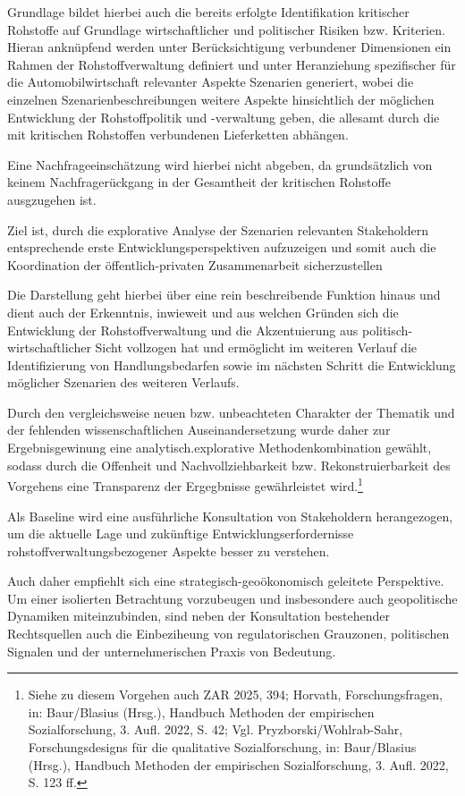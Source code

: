 \documentclass[12pt,a4paper,oneside]{book} %
\begin{document}
Grundlage bildet hierbei auch die bereits erfolgte Identifikation kritischer Rohstoffe auf Grundlage wirtschaftlicher und politischer Risiken bzw. Kriterien. Hieran anknüpfend werden unter Berücksichtigung verbundener Dimensionen ein Rahmen der Rohstoffverwaltung definiert und unter Heranziehung spezifischer für die Automobilwirtschaft relevanter Aspekte Szenarien generiert, wobei die einzelnen Szenarienbeschreibungen weitere Aspekte hinsichtlich der möglichen Entwicklung der Rohstoffpolitik und -verwaltung geben, die allesamt durch die mit kritischen Rohstoffen verbundenen Lieferketten abhängen.

Eine Nachfrageeinschätzung wird hierbei nicht abgeben, da grundsätzlich von keinem Nachfragerückgang in der Gesamtheit der kritischen Rohstoffe ausgzugehen ist.\autocite{bibid}

Ziel ist, durch die explorative Analyse der Szenarien relevanten Stakeholdern entsprechende erste Entwicklungsperspektiven aufzuzeigen und somit auch die Koordination der öffentlich-privaten Zusammenarbeit sicherzustellen

Die Darstellung geht hierbei über eine rein beschreibende Funktion hinaus und dient auch der Erkenntnis, inwieweit und aus welchen Gründen sich die Entwicklung der Rohstoffverwaltung und die Akzentuierung aus politisch-wirtschaftlicher Sicht vollzogen hat und ermöglicht im weiteren Verlauf die Identifizierung von Handlungsbedarfen sowie im nächsten Schritt die Entwicklung möglicher Szenarien des weiteren Verlaufs.

Durch den vergleichsweise neuen bzw. unbeachteten Charakter der Thematik und der fehlenden wissenschaftlichen Auseinandersetzung wurde daher zur Ergebnisgewinung eine analytisch.explorative Methodenkombination gewählt, sodass durch die Offenheit und Nachvollziehbarkeit bzw. Rekonstruierbarkeit des Vorgehens eine Transparenz der Ergegbnisse gewährleistet wird.\footnote{Siehe zu diesem Vorgehen auch ZAR 2025, 394; Horvath, Forschungsfragen, in: Baur/Blasius (Hrsg.), Handbuch Methoden der empirischen Sozialforschung, 3. Aufl. 2022, S. 42; Vgl. Pryzborski/Wohlrab-Sahr, Forschungsdesigns für die qualitative Sozialforschung, in: Baur/Blasius (Hrsg.), Handbuch Methoden der empirischen Sozialforschung, 3. Aufl. 2022, S. 123 ff.}

Als Baseline wird eine ausführliche Konsultation von Stakeholdern herangezogen, um die aktuelle Lage und zukünftige Entwicklungserfordernisse rohstoffverwaltungsbezogener Aspekte besser zu verstehen.

Auch daher empfiehlt sich eine strategisch-geoökonomisch geleitete Perspektive. Um einer isolierten Betrachtung vorzubeugen und insbesondere auch geopolitische Dynamiken miteinzubinden, sind neben der Konsultation bestehender Rechtsquellen auch die Einbeziheung von regulatorischen Grauzonen, politischen Signalen\autocite{Neckel: Exportkontrolle im geopolitischen Wettstreit(EuZW 2025, 710), 716} und der unternehmerischen Praxis von Bedeutung.
\end{document}
